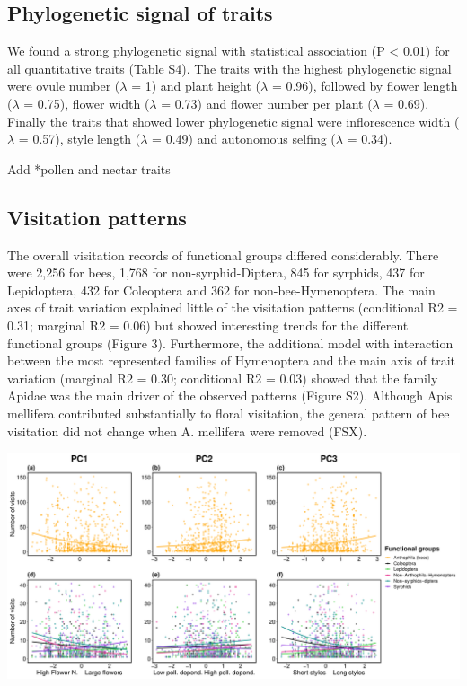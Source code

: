 \documentclass[12pt,a4paper,]{article}
\begin{document}
\subsection{Phylogenetic signal of
traits}\label{phylogenetic-signal-of-traits-1}

We found a strong phylogenetic signal with statistical association (P
\textless{} 0.01) for all quantitative traits (Table S4). The traits
with the highest phylogenetic signal were ovule number (\(\lambda\) = 1)
and plant height (\(\lambda\) = 0.96), followed by flower length
(\(\lambda\) = 0.75), flower width (\(\lambda\) = 0.73) and flower
number per plant (\(\lambda\) = 0.69). Finally the traits that showed
lower phylogenetic signal were inflorescence width (\(\lambda\) = 0.57),
style length (\(\lambda\) = 0.49) and autonomous selfing (\(\lambda\) =
0.34).

Add *pollen and nectar traits

\subsection{Visitation patterns}\label{visitation-patterns}

The overall visitation records of functional groups differed
considerably. There were 2,256 for bees, 1,768 for non-syrphid-Diptera,
845 for syrphids, 437 for Lepidoptera, 432 for Coleoptera and 362 for
non-bee-Hymenoptera. The main axes of trait variation explained little
of the visitation patterns (conditional R2 = 0.31; marginal R2 = 0.06)
but showed interesting trends for the different functional groups
(Figure 3). Furthermore, the additional model with interaction between
the most represented families of Hymenoptera and the main axis of trait
variation (marginal R2 = 0.30; conditional R2 = 0.03) showed that the
family Apidae was the main driver of the observed patterns (Figure S2).
Although Apis mellifera contributed substantially to floral visitation,
the general pattern of bee visitation did not change when A. mellifera
were removed (FSX).

\includegraphics{output/figures/unnamed-chunk-7-1.pdf}
\end{document}
